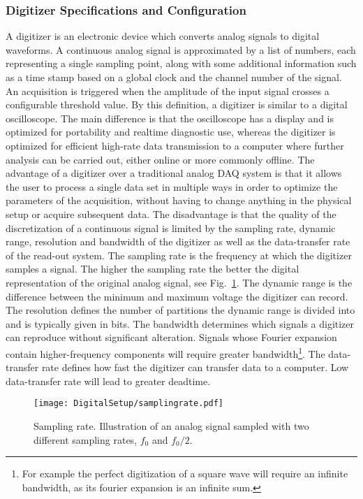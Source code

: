 \documentclass[main.tex]{subfiles}
\begin{document}
\subsubsection{Digitizer Specifications and Configuration}
A digitizer is an electronic device which converts analog signals to digital waveforms. A continuous analog signal is approximated by a list of numbers, each representing a single sampling point, along with some additional information such as a time stamp based on a global clock and the channel number of the signal. An acquisition is triggered when the amplitude of the input signal crosses a configurable threshold value.
By this definition, a digitizer is similar to a digital oscilloscope. The main difference is that the oscilloscope has a display and is optimized for portability and realtime diagnostic use, whereas the digitizer is optimized for efficient high-rate data transmission to a computer where further analysis can be carried out, either online or more commonly offline.
The advantage of a digitizer over a traditional analog DAQ system is that it allows the user to process a single data set in multiple ways in order to optimize the parameters of the acquisition, without having to change anything in the physical setup or acquire subsequent data. The disadvantage is that the quality of the discretization of a continuous signal is limited by the sampling rate, dynamic range, resolution and bandwidth of the digitizer as well as the data-transfer rate of the read-out system. 
The sampling rate is the frequency at which the digitizer samples a signal. The higher the sampling rate the better the digital representation of the original analog signal, see Fig.~\ref{fig:samplingrate}.
The dynamic range is the difference between the minimum and maximum voltage the digitizer can record. The resolution defines the number of partitions the dynamic range is divided into and is typically given in bits. The bandwidth determines which signals a digitizer can reproduce without significant alteration. Signals whose Fourier expansion contain higher-frequency components will require greater bandwidth\footnote{For example the perfect digitization of a square wave will require an infinite bandwidth, as its fourier expansion is an infinite sum.}. The data-transfer rate defines how fast the digitizer can transfer data to a computer. Low data-transfer rate will lead to greater deadtime.

\begin{figure}[ht]
	\centering
    	\texttt{[image: DigitalSetup/samplingrate.pdf]}
        \caption[Sampling rate.]{Sampling rate. Illustration of an analog signal sampled with two different sampling rates, $f_0$ and $f_0/2$.}
	    \label{fig:samplingrate} 
\end{figure}
\end{document}
